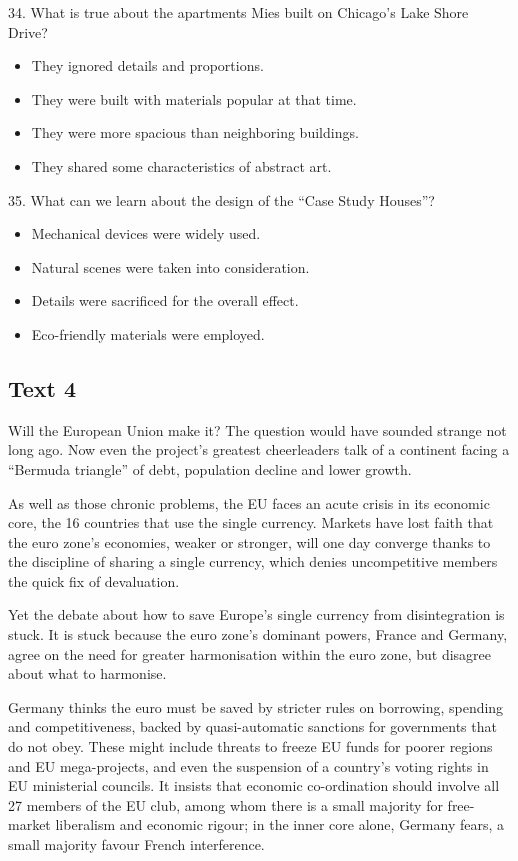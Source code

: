 \documentclass[UTF8,11pt]{ctexart}
\begin{document}
34. What is true about the apartments Mies built on Chicago’s Lake Shore Drive?


\begin{itemize}[leftmargin=2em,itemsep=.2em,topsep=.4em]\item[A.] They ignored details and proportions.
\item[B.] They were built with materials popular at that time.
\item[C.] They were more spacious than neighboring buildings.
\item[D.] They shared some characteristics of abstract art.
\end{itemize}

35. What can we learn about the design of the “Case Study Houses”?


\begin{itemize}[leftmargin=2em,itemsep=.2em,topsep=.4em]\item[A.] Mechanical devices were widely used.
\item[B.] Natural scenes were taken into consideration.
\item[C.] Details were sacrificed for the overall effect.
\item[D.] Eco-friendly materials were employed.
\end{itemize}

\subsection*{\textbf{Text 4}}


Will the European Union make it? The question would have sounded strange not long ago. Now even the project’s greatest cheerleaders talk of a continent facing a “Bermuda triangle” of debt, population decline and lower growth.


As well as those chronic problems, the EU faces an acute crisis in its economic core, the 16 countries that use the single currency. Markets have lost faith that the euro zone’s economies, weaker or stronger, will one day converge thanks to the discipline of sharing a single currency, which denies uncompetitive members the quick fix of devaluation.


Yet the debate about how to save Europe’s single currency from disintegration is stuck. It is stuck because the euro zone’s dominant powers, France and Germany, agree on the need for greater harmonisation within the euro zone, but disagree about what to harmonise.


Germany thinks the euro must be saved by stricter rules on borrowing, spending and competitiveness, backed by quasi-automatic sanctions for governments that do not obey. These might include threats to freeze EU funds for poorer regions and EU mega-projects, and even the suspension of a country’s voting rights in EU ministerial councils. It insists that economic co-ordination should involve all 27 members of the EU club, among whom there is a small majority for free-market liberalism and economic rigour; in the inner core alone, Germany fears, a small majority favour French interference.
\end{document}
